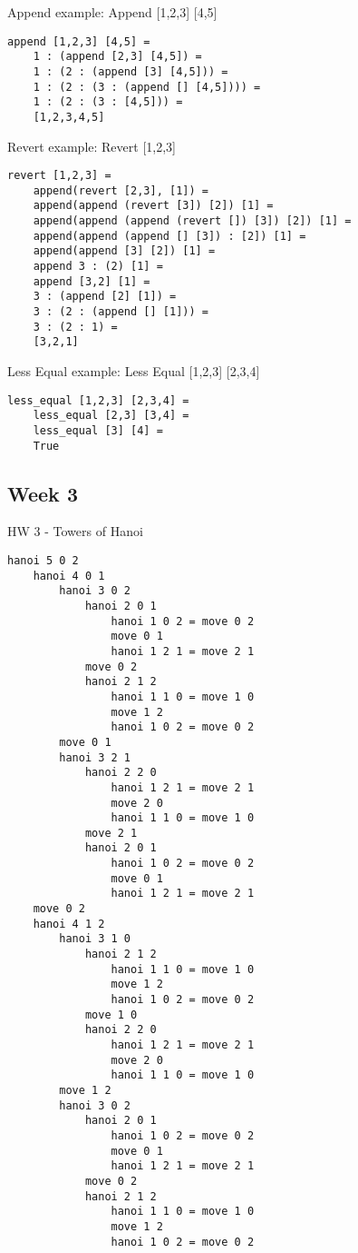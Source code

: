 \documentclass{article}
\theoremstyle{theorem}
\theoremstyle{definition}
\theoremstyle{remark}
\begin{document}
\noindent
Append example: 
\newline\newline\indent
Append [1,2,3] [4,5]
\begin{lstlisting}
append [1,2,3] [4,5] = 
    1 : (append [2,3] [4,5]) = 
    1 : (2 : (append [3] [4,5])) = 
    1 : (2 : (3 : (append [] [4,5]))) = 
    1 : (2 : (3 : [4,5])) = 
    [1,2,3,4,5]
\end{lstlisting}
%

\noindent
Revert example: 
\newline\newline\indent
Revert [1,2,3]
\begin{lstlisting}
revert [1,2,3] = 
    append(revert [2,3], [1]) =
    append(append (revert [3]) [2]) [1] =
    append(append (append (revert []) [3]) [2]) [1] = 
    append(append (append [] [3]) : [2]) [1] =
    append(append [3] [2]) [1] =
    append 3 : (2) [1] =
    append [3,2] [1] =
    3 : (append [2] [1]) =
    3 : (2 : (append [] [1])) =
    3 : (2 : 1) =
    [3,2,1]
\end{lstlisting}
%

\noindent
Less Equal example: 
\newline\newline\indent
Less Equal [1,2,3] [2,3,4]
\begin{lstlisting}
less_equal [1,2,3] [2,3,4] = 
    less_equal [2,3] [3,4] =
    less_equal [3] [4] =
    True
\end{lstlisting}
%

\subsection{Week 3}

HW 3 - Towers of Hanoi

\begin{lstlisting}
hanoi 5 0 2  
	hanoi 4 0 1 
		hanoi 3 0 2
			hanoi 2 0 1 
				hanoi 1 0 2 = move 0 2 
				move 0 1
				hanoi 1 2 1 = move 2 1 
			move 0 2  
			hanoi 2 1 2  
				hanoi 1 1 0 = move 1 0  
				move 1 2  
				hanoi 1 0 2 = move 0 2 
        move 0 1
        hanoi 3 2 1
            hanoi 2 2 0
                hanoi 1 2 1 = move 2 1
                move 2 0
                hanoi 1 1 0 = move 1 0
            move 2 1
            hanoi 2 0 1
                hanoi 1 0 2 = move 0 2
                move 0 1
                hanoi 1 2 1 = move 2 1
    move 0 2
    hanoi 4 1 2
        hanoi 3 1 0
            hanoi 2 1 2
                hanoi 1 1 0 = move 1 0
                move 1 2
                hanoi 1 0 2 = move 0 2
            move 1 0
            hanoi 2 2 0
                hanoi 1 2 1 = move 2 1
                move 2 0
                hanoi 1 1 0 = move 1 0
        move 1 2
        hanoi 3 0 2
            hanoi 2 0 1
                hanoi 1 0 2 = move 0 2
                move 0 1
                hanoi 1 2 1 = move 2 1
            move 0 2
            hanoi 2 1 2
                hanoi 1 1 0 = move 1 0
                move 1 2
                hanoi 1 0 2 = move 0 2
\end{lstlisting}
%
\end{document}
